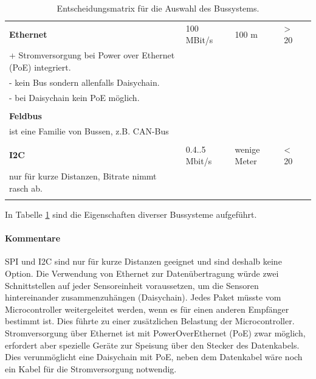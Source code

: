 \begin{table}
\begin{tabular}{|l|l|l|l|l|}
\begin{minipage}{6cm}
\end{minipage} \\ 
\hline \textbf{Ethernet} & 100 MBit/s & 100 m & > 20 & \begin{minipage}{6cm}
\mbox{ }\\+ Stromversorgung bei Power over Ethernet (PoE) integriert.\\
- kein Bus sondern allenfalls Daisychain.\\
- bei Daisychain kein PoE möglich.\\
\end{minipage} \\ 
\hline \textbf{Feldbus} &  &  &  & \begin{minipage}{6cm}
\mbox{ }\\ist eine Familie von Bussen, z.B. CAN-Bus\\
\end{minipage} \\ 
\hline \textbf{I2C} & 0.4..5 Mbit/s & wenige Meter & < 20 & \begin{minipage}{6cm}
\mbox{ }\\nur für kurze Distanzen, Bitrate nimmt rasch ab.\\
\end{minipage}\\
\hline 
\end{tabular}
\caption{Entscheidungsmatrix für die Auswahl des Bussystems.}
\label{table.bussystem}
\end{table} 

In Tabelle \ref{table.bussystem} sind die Eigenschaften diverser Bussysteme aufgeführt.

\paragraph{Kommentare}
SPI und I2C sind nur für kurze Distanzen geeignet und sind deshalb keine Option.
Die Verwendung von Ethernet zur Datenübertragung würde zwei Schnittstellen auf jeder Sensoreinheit voraussetzen, um die Sensoren hintereinander zusammenzuhängen (Daisychain). Jedes Paket müsste vom Microcontroller weitergeleitet werden, wenn es für einen anderen Empfänger bestimmt ist. Dies führte zu einer zusätzlichen Belastung der Microcontroller. Stromversorgung über Ethernet ist mit PowerOverEthernet (PoE) zwar möglich, erfordert aber spezielle Geräte zur Speisung über den Stecker des Datenkabels. Dies verunmöglicht eine Daisychain mit PoE, neben dem Datenkabel wäre noch ein Kabel für die Stromversorgung notwendig.

